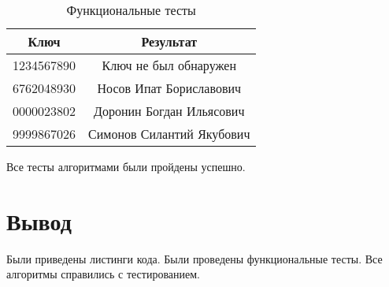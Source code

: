 \FloatBarrier
\begin{table}[h]
	\caption{Функциональные тесты}
	\centering
	\begin{tabular}{| c | c |}
		\hline
		Ключ & Результат \\ \hline
		1234567890 & Ключ не был обнаружен \\
		6762048930 & Носов Ипат Бориславович \\
		0000023802 & Доронин Богдан Ильясович \\
		9999867026 & Симонов Силантий Якубович \\
		\hline
	\end{tabular}
\end{table}
\FloatBarrier
Все тесты алгоритмами были пройдены успешно.

\section{Вывод}
Были приведены листинги кода.
Были проведены функциональные тесты.
Все алгоритмы справились с тестированием.